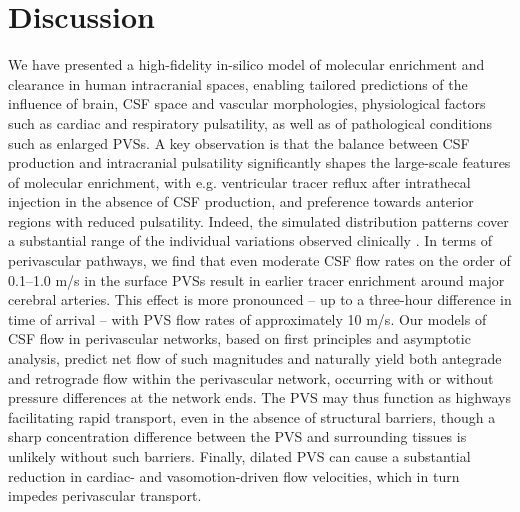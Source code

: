 \documentclass[fleqn,10pt]{wlscirep}
\begin{document}





\section*{Discussion}

We have presented a high-fidelity in-silico model of molecular
enrichment and clearance in human intracranial spaces, enabling
tailored predictions of the influence of brain, CSF space and vascular
morphologies, physiological factors such as cardiac and respiratory
pulsatility, as well as of pathological conditions such as enlarged
PVSs. A key observation is that the balance between CSF production and
intracranial pulsatility significantly shapes the large-scale features
of molecular enrichment, with e.g. ventricular tracer reflux after
intrathecal injection in the absence of CSF production, and preference
towards anterior regions with reduced pulsatility. Indeed, the
simulated distribution patterns cover a substantial range of the
individual variations observed clinically \cite{ringstad2018brain}. In
terms of perivascular pathways, we find that even moderate CSF flow
rates on the order of 0.1--1.0 \textmu m/s in the surface PVSs result
in earlier tracer enrichment around major cerebral arteries. This
effect is more pronounced -- up to a three-hour difference in time of
arrival -- with PVS flow rates of approximately 10 \textmu m/s.  Our
models of CSF flow in perivascular networks, based on first principles
and asymptotic analysis, predict net flow of such magnitudes and
naturally yield both antegrade and retrograde flow within the
perivascular network, occurring with or without pressure differences
at the network ends. The PVS may thus function as highways
facilitating rapid transport, even in the absence of structural
barriers, though a sharp concentration difference between the PVS and
surrounding tissues is unlikely without such barriers. Finally,
dilated PVS can cause a substantial reduction in cardiac- and
vasomotion-driven flow velocities, which in turn impedes perivascular
transport.
\end{document}
